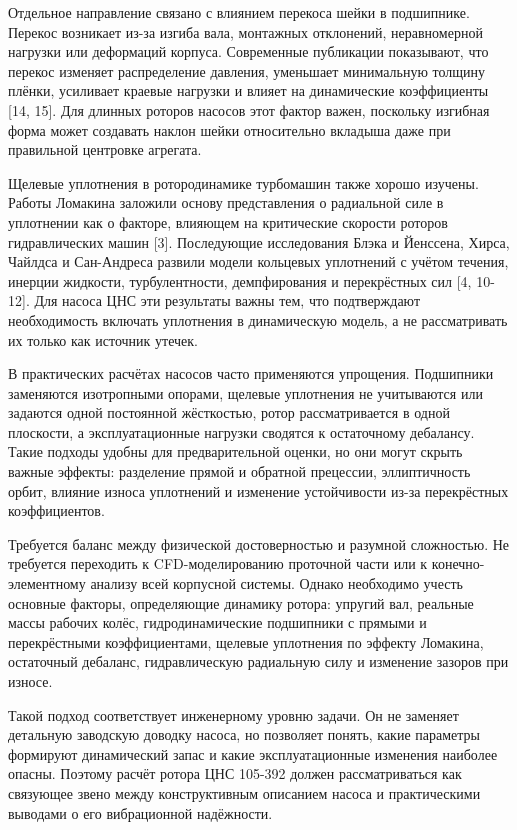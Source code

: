 Отдельное направление связано с влиянием перекоса шейки в подшипнике. Перекос возникает из-за изгиба вала, монтажных отклонений, неравномерной нагрузки или деформаций корпуса. Современные публикации показывают, что перекос изменяет распределение давления, уменьшает минимальную толщину плёнки, усиливает краевые нагрузки и влияет на динамические коэффициенты [14, 15]. Для длинных роторов насосов этот фактор важен, поскольку изгибная форма может создавать наклон шейки относительно вкладыша даже при правильной центровке агрегата.

Щелевые уплотнения в ротородинамике турбомашин также хорошо изучены. Работы Ломакина заложили основу представления о радиальной силе в уплотнении как о факторе, влияющем на критические скорости роторов гидравлических машин [3]. Последующие исследования Блэка и Йенссена, Хирса, Чайлдса и Сан-Андреса развили модели кольцевых уплотнений с учётом течения, инерции жидкости, турбулентности, демпфирования и перекрёстных сил [4, 10-12]. Для насоса ЦНС эти результаты важны тем, что подтверждают необходимость включать уплотнения в динамическую модель, а не рассматривать их только как источник утечек.

В практических расчётах насосов часто применяются упрощения. Подшипники заменяются изотропными опорами, щелевые уплотнения не учитываются или задаются одной постоянной жёсткостью, ротор рассматривается в одной плоскости, а эксплуатационные нагрузки сводятся к остаточному дебалансу. Такие подходы удобны для предварительной оценки, но они могут скрыть важные эффекты: разделение прямой и обратной прецессии, эллиптичность орбит, влияние износа уплотнений и изменение устойчивости из-за перекрёстных коэффициентов.

Требуется баланс между физической достоверностью и разумной сложностью. Не требуется переходить к CFD-моделированию проточной части или к конечно-элементному анализу всей корпусной системы. Однако необходимо учесть основные факторы, определяющие динамику ротора: упругий вал, реальные массы рабочих колёс, гидродинамические подшипники с прямыми и перекрёстными коэффициентами, щелевые уплотнения по эффекту Ломакина, остаточный дебаланс, гидравлическую радиальную силу и изменение зазоров при износе.

Такой подход соответствует инженерному уровню задачи. Он не заменяет детальную заводскую доводку насоса, но позволяет понять, какие параметры формируют динамический запас и какие эксплуатационные изменения наиболее опасны. Поэтому расчёт ротора ЦНС 105-392 должен рассматриваться как связующее звено между конструктивным описанием насоса и практическими выводами о его вибрационной надёжности.

